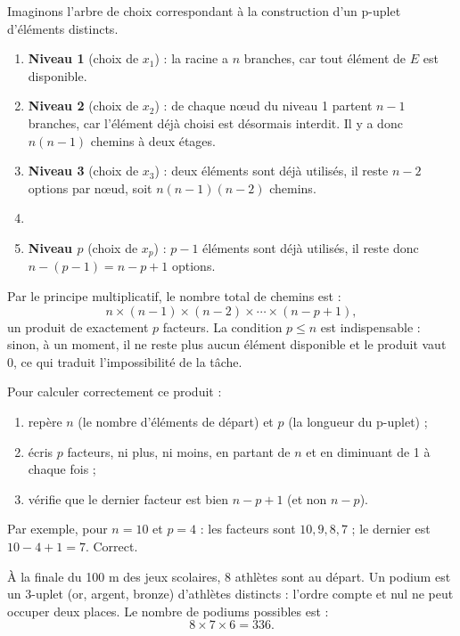 \documentclass[11pt]{article}
\def\vdots{\mathord{\vbox{\baselineskip3.2pt\lineskiplimit0pt\kern4pt\hbox{.}\hbox{.}\hbox{.}}}}%
\begin{document}
\begin{experience}
Imaginons l'arbre de choix correspondant à la construction d'un p-uplet d'éléments distincts.
\begin{enumerate}
\item \textbf{Niveau 1} (choix de $x_1$) : la racine a $n$ branches, car tout élément de $E$ est disponible.
\item \textbf{Niveau 2} (choix de $x_2$) : de chaque nœud du niveau 1 partent $n-1$ branches, car l'élément déjà choisi est désormais interdit. Il y a donc $n(n-1)$ chemins à deux étages.
\item \textbf{Niveau 3} (choix de $x_3$) : deux éléments sont déjà utilisés, il reste $n-2$ options par nœud, soit $n(n-1)(n-2)$ chemins.
\item[$\vdots$]
\item \textbf{Niveau $p$} (choix de $x_p$) : $p-1$ éléments sont déjà utilisés, il reste donc $n-(p-1) = n-p+1$ options.
\end{enumerate}
Par le principe multiplicatif, le nombre total de chemins est :
\[ n \times (n-1) \times (n-2) \times \cdots \times (n-p+1), \]
un produit de exactement $p$ facteurs. La condition $p \leq n$ est indispensable : sinon, à un moment, il ne reste plus aucun élément disponible et le produit vaut 0, ce qui traduit l'impossibilité de la tâche.
\end{experience}

\begin{methode}
Pour calculer correctement ce produit :
\begin{enumerate}
\item repère $n$ (le nombre d'éléments de départ) et $p$ (la longueur du p-uplet) ;
\item écris $p$ facteurs, ni plus, ni moins, en partant de $n$ et en diminuant de 1 à chaque fois ;
\item vérifie que le dernier facteur est bien $n - p + 1$ (et non $n - p$).
\end{enumerate}
Par exemple, pour $n = 10$ et $p = 4$ : les facteurs sont $10, 9, 8, 7$ ; le dernier est $10 - 4 + 1 = 7$. Correct.
\end{methode}

\begin{exemplebox}
À la finale du 100 m des jeux scolaires, 8 athlètes sont au départ. Un podium est un 3-uplet (or, argent, bronze) d'athlètes distincts : l'ordre compte et nul ne peut occuper deux places. Le nombre de podiums possibles est :
\[ 8 \times 7 \times 6 = 336. \]
\end{exemplebox}
\end{document}

